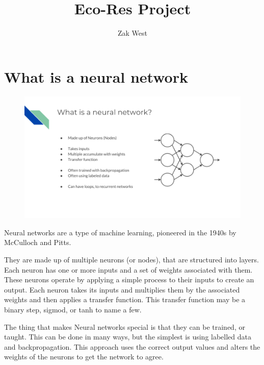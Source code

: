 \documentclass[10pt]{article}
\title{Eco-Res Project}
\author{Zak West}
\begin{document}
    
	\maketitle
	

    	
	\section*{What is a neural network}
	    
	    \begin{figure}[H]
            \centering
            \includegraphics[width=1\textwidth]{slide_1}
            \label{fig:appendix:slide_1}
        \end{figure}
        
        Neural networks are a type of machine learning, pioneered in the 1940s by McCulloch and Pitts. 
        
        They are made up of multiple neurons (or nodes), that are structured into layers. Each neuron has one or more inputs and a set of weights associated with them. These neurons operate by applying a simple process to their inputs to create an output. Each neuron takes its inputs and multiplies them by the associated weights and then applies a transfer function. This transfer function may be a binary step, sigmod, or tanh to name a few.  
        
        The thing that makes Neural networks special is that they can be trained, or taught.  This can be done in many ways, but the simplest is using labelled data and backpropagation. This approach uses the correct output values and alters the weights of the neurons to get the network to agree. 
        
\end{document}
